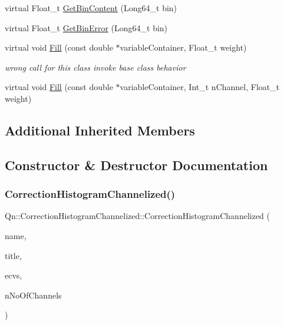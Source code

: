 \begin{DoxyCompactItemize}
\item 
virtual Float\+\_\+t \mbox{\hyperlink{classQn_1_1CorrectionHistogramChannelized_ab398b7a1d5d9a92e183ea164882b4a53}{Get\+Bin\+Content}} (Long64\+\_\+t bin)
\item 
virtual Float\+\_\+t \mbox{\hyperlink{classQn_1_1CorrectionHistogramChannelized_a5982f9fa3ce2eb199cfdd2e518c4cb4e}{Get\+Bin\+Error}} (Long64\+\_\+t bin)
\item 
\mbox{\label{classQn_1_1CorrectionHistogramChannelized_a9fee26c0616694e955b8785a2714b958}} 
virtual void \mbox{\hyperlink{classQn_1_1CorrectionHistogramChannelized_a9fee26c0616694e955b8785a2714b958}{Fill}} (const double $\ast$variable\+Container, Float\+\_\+t weight)
\begin{DoxyCompactList}\small\item\em wrong call for this class invoke base class behavior \end{DoxyCompactList}\item 
virtual void \mbox{\hyperlink{classQn_1_1CorrectionHistogramChannelized_a3191ab6b7b9be07eab43133ba4200ce1}{Fill}} (const double $\ast$variable\+Container, Int\+\_\+t n\+Channel, Float\+\_\+t weight)
\end{DoxyCompactItemize}
\subsection*{Additional Inherited Members}


\subsection{Constructor \& Destructor Documentation}
\mbox{\label{classQn_1_1CorrectionHistogramChannelized_a89826506f8b6aa57a6352382a25f7ddc}} 
\subsubsection{\texorpdfstring{Correction\+Histogram\+Channelized()}{CorrectionHistogramChannelized()}}
{\footnotesize\ttfamily Qn\+::\+Correction\+Histogram\+Channelized\+::\+Correction\+Histogram\+Channelized (\begin{DoxyParamCaption}\item[{const char $\ast$}]{name,  }\item[{const char $\ast$}]{title,  }\item[{\mbox{\hyperlink{classQn_1_1EventClassVariablesSet}{Event\+Class\+Variables\+Set}} \&}]{ecvs,  }\item[{Int\+\_\+t}]{n\+No\+Of\+Channels }\end{DoxyParamCaption})}

